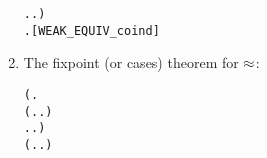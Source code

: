 \begin{enumerate}
\begin{small}
\begin{alltt}
        \HOLSymConst{\HOLTokenForall{}}.  \HOLTokenTransBegin\HOLSymConst{\ensuremath{\tau}}\HOLTokenTransEnd {} \HOLSymConst{\HOLTokenImp{}} \HOLSymConst{\HOLTokenExists{}}.  \HOLSymConst{\HOLTokenEPS}  \HOLSymConst{\HOLTokenConj{}}   ) \HOLSymConst{\HOLTokenImp{}}
   \HOLSymConst{\HOLTokenForall{}} .    \HOLSymConst{\HOLTokenImp{}}  \HOLSymConst{\HOLTokenWeakEQ} \hfill{[WEAK_EQUIV_coind]}
\end{alltt}
\end{small}
\item The fixpoint (or cases) theorem for $\approx$:
\begin{small}
\begin{alltt}
\HOLTokenTurnstile{}  \HOLSymConst{\HOLTokenWeakEQ}  \HOLSymConst{\HOLTokenEquiv{}}
   (\HOLSymConst{\HOLTokenForall{}}.
        (\HOLSymConst{\HOLTokenForall{}}.  \HOLTokenTransBegin{} \HOLTokenTransEnd {} \HOLSymConst{\HOLTokenImp{}} \HOLSymConst{\HOLTokenExists{}}.  \HOLTokenWeakTransBegin{} \HOLTokenWeakTransEnd {} \HOLSymConst{\HOLTokenConj{}}  \HOLSymConst{\HOLTokenWeakEQ} ) \HOLSymConst{\HOLTokenConj{}}
        \HOLSymConst{\HOLTokenForall{}}.  \HOLTokenTransBegin{} \HOLTokenTransEnd {} \HOLSymConst{\HOLTokenImp{}} \HOLSymConst{\HOLTokenExists{}}.  \HOLTokenWeakTransBegin{} \HOLTokenWeakTransEnd {} \HOLSymConst{\HOLTokenConj{}}  \HOLSymConst{\HOLTokenWeakEQ} ) \HOLSymConst{\HOLTokenConj{}}
   (\HOLSymConst{\HOLTokenForall{}}.  \HOLTokenTransBegin\HOLSymConst{\ensuremath{\tau}}\HOLTokenTransEnd {} \HOLSymConst{\HOLTokenImp{}} \HOLSymConst{\HOLTokenExists{}}.  \HOLSymConst{\HOLTokenEPS}  \HOLSymConst{\HOLTokenConj{}}  \HOLSymConst{\HOLTokenWeakEQ} ) \HOLSymConst{\HOLTokenConj{}}

\end{alltt}
\end{small}
\end{enumerate}

